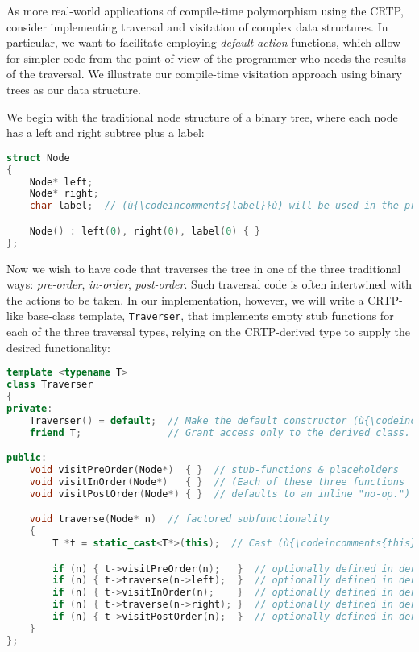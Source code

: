 As more real-world applications of compile-time polymorphism using the CRTP,
consider implementing traversal and visitation of complex data
structures. In particular, we want to facilitate employing
\emph{default-action} functions, which allow for simpler code from the
point of view of the programmer who needs the results of the traversal.
We illustrate our compile-time visitation approach using binary trees as
our data structure.

We begin with the traditional node structure of a binary tree, where
each node has a left and right subtree plus a label:

\begin{lstlisting}[language=C++]
struct Node
{
    Node* left;
    Node* right;
    char label;  // (ù{\codeincomments{label}}ù) will be used in the pre-order example.

    Node() : left(0), right(0), label(0) { }
};
\end{lstlisting}

\noindent Now we wish to have code that traverses the tree in one of the three
traditional ways: \emph{pre-order}, \emph{in-order}, \emph{post-order}.
Such traversal code is often intertwined with the actions to be taken.
In our implementation, however, we will write a CRTP-like base-class
template, \texttt{Traverser}, that implements empty stub functions for
each of the three traversal types, relying on the CRTP-derived
type to supply the desired functionality:

\begin{lstlisting}[language=C++]
template <typename T>
class Traverser
{
private:
    Traverser() = default;  // Make the default constructor (ù{\codeincomments{private}}ù).
    friend T;               // Grant access only to the derived class.

public:
    void visitPreOrder(Node*)  { }  // stub-functions & placeholders
    void visitInOrder(Node*)   { }  // (Each of these three functions
    void visitPostOrder(Node*) { }  // defaults to an inline "no-op.")

    void traverse(Node* n)  // factored subfunctionality
    {
        T *t = static_cast<T*>(this);  // Cast (ù{\codeincomments{this}}ù) to the derived type.

        if (n) { t->visitPreOrder(n);   }  // optionally defined in derived
        if (n) { t->traverse(n->left);  }  // optionally defined in derived
        if (n) { t->visitInOrder(n);    }  // optionally defined in derived
        if (n) { t->traverse(n->right); }  // optionally defined in derived
        if (n) { t->visitPostOrder(n);  }  // optionally defined in derived
    }
};
\end{lstlisting}

